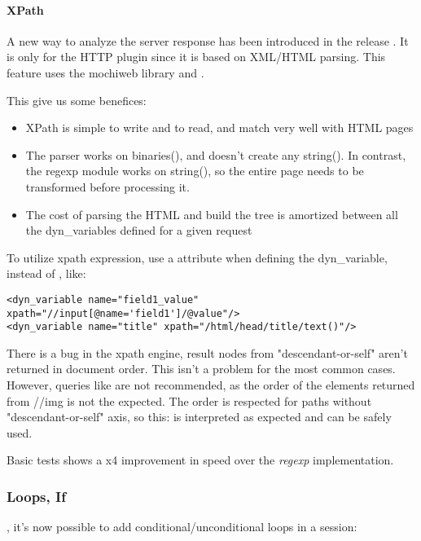 \documentclass{TSUNG-en}
\begin{document}
\paragraph{XPath}

A new way to analyze the server response has been introduced in the
release . It is only for the HTTP plugin since it is
based on XML/HTML parsing. This feature uses the mochiweb library
and .

This give us some benefices:

\begin{itemize}
\item XPath is simple to write and to read, and match very well with
  HTML pages
\item The parser works on binaries(), and doesn't create any
  string(). In contrast, the regexp module works on string(), so the
  entire page needs to be  transformed before
  processing it.
\item The cost of parsing the HTML and build the tree is amortized
  between all the dyn\_variables defined for a given request
\end{itemize}

To utilize xpath expression, use a  attribute when
defining the dyn\_variable, instead of , like:
\begin{Verbatim}
<dyn_variable name="field1_value" xpath="//input[@name='field1']/@value"/>
<dyn_variable name="title" xpath="/html/head/title/text()"/>
\end{Verbatim}

There is a bug in the xpath engine, result nodes from "descendant-or-self" aren't returned in document order. This isn't a problem for the most common cases.
However, queries like  are not recommended, as the order of the  elements returned from //img is not the expected.
The order is respected for paths without "descendant-or-self" axis, so this:  is interpreted as expected and can be safely used.

Basic tests shows a x4 improvement in speed over the \emph{regexp} implementation.

\subsubsection{Loops, If}

, it's now possible to add conditional/unconditional loops in a session:
\end{document}
